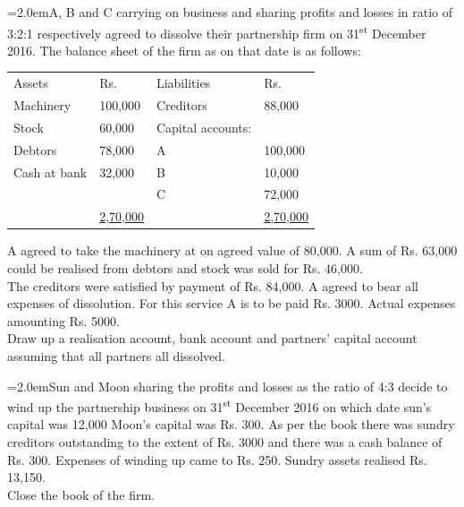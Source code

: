 \documentclass[11pt,a4paper]{article}
\newcommand{\lqn}[2]{\Needspace{6\baselineskip}\par\medskip\noindent\hangindent=2.0em\hangafter=1\makebox[2.0em][l]{\textbf{#1.}}#2\par}
\begin{document}
\lqn{112}{A, B and C carrying on business and sharing profits and losses in ratio of 3:2:1 respectively agreed to dissolve their partnership firm on 31\textsuperscript{st} December 2016. The balance sheet of the firm as on that date is as follows:\par
\par\smallskip\noindent\hspace*{1.2em}\begin{tabular}{|llll|}
\hline
Assets & Rs. & Liabilities & Rs. \\
Machinery & 100,000 & Creditors & 88,000 \\
Stock & 60,000 & Capital accounts: &  \\
Debtors & 78,000 & A & 100,000 \\
Cash at bank & 32,000 & B & 10,000 \\
 &  & C & 72,000 \\
 & \underline{2,70,000} &  & \underline{2,70,000} \\
\hline
\end{tabular}\par\smallskip
A agreed to take the machinery at on agreed value of 80,000. A sum of Rs. 63,000 could be realised from debtors and stock was sold for Rs. 46,000.\\
The creditors were satisfied by payment of Rs. 84,000. A agreed to bear all expenses of dissolution. For this service A is to be paid  Rs. 3000. Actual expenses amounting Rs. 5000.\\
Draw up a realisation account, bank account and partners’ capital account  assuming that all partners all dissolved.\par
}
\lqn{113}{Sun and Moon sharing the profits and losses as the ratio of 4:3 decide to wind up the partnership business on 31\textsuperscript{st}  December 2016 on which date sun’s capital was 12,000 Moon’s capital was Rs. 300. As per the book there was sundry creditors outstanding to the extent of Rs. 3000 and there was a cash balance of Rs. 300. Expenses of winding up came to Rs. 250. Sundry assets realised Rs. 13,150.\\
Close the book of the firm.\par
}
\end{document}
